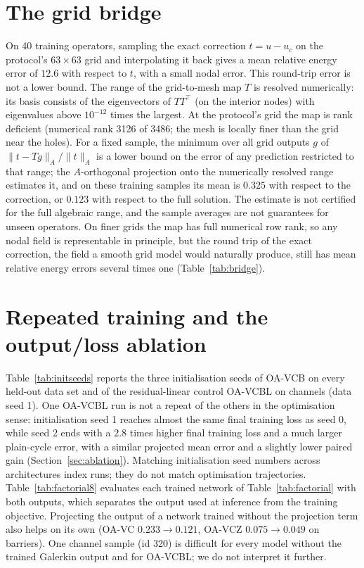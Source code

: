 \section{The grid bridge}\label{app:bridge}

On 40 training operators, sampling the exact correction $t=u-u_c$ on the protocol's $63\times63$ grid and interpolating it back
gives a mean relative energy error of $12.6$ with respect to $t$, with a small nodal error. This round-trip error is not a lower
bound. The range of the grid-to-mesh map $T$ is resolved numerically: its basis consists of the eigenvectors of $TT^\top$ (on the
interior nodes) with eigenvalues above $10^{-12}$ times the largest. At the protocol's grid the map is rank deficient (numerical
rank 3126 of 3486; the mesh is locally finer than the grid near the holes). For a fixed sample, the minimum over all grid outputs
$g$ of $\|t-Tg\|_A/\|t\|_A$ is a lower bound on the error of any prediction restricted to that range; the $A$-orthogonal
projection onto the numerically resolved range estimates it, and on these training samples its mean is $0.325$ with respect to
the correction, or $0.123$ with respect to the full solution. The estimate is not certified for the full algebraic range, and the
sample averages are not guarantees for unseen operators. On finer grids the map has full numerical row rank, so any nodal field is
representable in principle, but the round trip of the exact correction, the field a smooth grid model would naturally produce,
still has mean relative energy errors several times one (Table~\ref{tab:bridge}).

\section{Repeated training and the output/loss ablation}\label{app:repeat}


Table~\ref{tab:initseeds} reports the three initialisation seeds of OA-VCB on every held-out data set and of the residual-linear
control OA-VCBL on channels (data seed 1). One OA-VCBL run is not a repeat of the others in the optimisation sense: initialisation
seed 1 reaches almost the same final training loss as seed 0, while seed 2 ends with a $2.8$ times higher final training loss and a
much larger plain-cycle error, with a similar projected mean error and a slightly lower paired gain (Section~\ref{sec:ablation}).
Matching initialisation seed numbers across architectures index runs; they do not match optimisation trajectories.
Table~\ref{tab:factorial8} evaluates each trained network of Table~\ref{tab:factorial} with both outputs, which separates the
output used at inference from the training objective. Projecting the output of a network trained without the projection term
also helps on its own (OA-VC $0.233\to0.121$, OA-VCZ $0.075\to0.049$ on barriers). One channel sample (id 320) is difficult for
every model without the trained Galerkin output and for OA-VCBL; we do not interpret it further.


